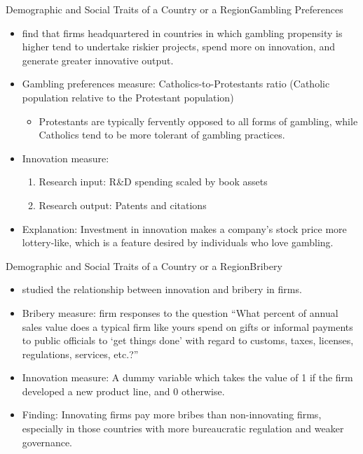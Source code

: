\documentclass{beamer}
\begin{document}
    \begin{frame}{Demographic and Social Traits of a Country or a Region}{Gambling Preferences}
        \begin{itemize}
            \item \citet{CPRV2014LocalGamblingPreferences} find that firms headquartered in countries in which gambling propensity is higher tend to undertake riskier projects, spend more on innovation, and generate greater innovative output.
            \item Gambling preferences measure: Catholics-to-Protestants ratio (Catholic population relative to the Protestant population)
            \begin{itemize}
                \item Protestants are typically fervently opposed to all forms of gambling, while Catholics tend to be more tolerant of gambling practices.
            \end{itemize}
            \item Innovation measure:
            \begin{enumerate}
                \item Research input: R\&D spending scaled by book assets
                \item Research output: Patents and citations
            \end{enumerate}
            \item Explanation: Investment in innovation makes a company's stock price more lottery-like, which is a feature desired by individuals who love gambling.
        \end{itemize}
    \end{frame}

    \begin{frame}{Demographic and Social Traits of a Country or a Region}{Bribery}
        \vspace{-1cm}
        \begin{itemize}
            \item \citet{ADM2014BribePaymentsInnovation} studied the relationship between innovation and bribery in firms.
            \item Bribery measure: firm responses to the question “What percent of annual sales value does a typical firm like yours spend on gifts or informal payments to public officials to ‘get things done’ with regard to customs, taxes, licenses, regulations, services, etc.?”
            \item Innovation measure: A dummy variable which takes the value of 1 if the firm developed a new product line, and 0 otherwise.
            \item Finding: Innovating firms pay more bribes than non-innovating firms, especially in those countries with more bureaucratic regulation and weaker governance.
        \end{itemize}
    \end{frame}
\end{document}
